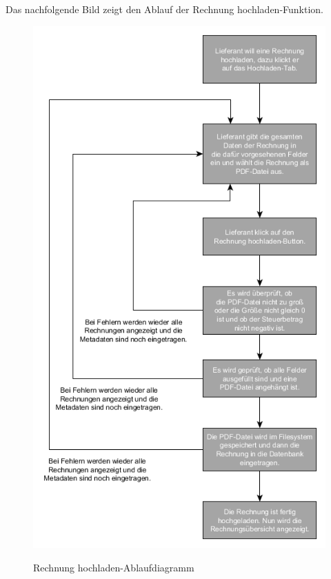 \newpage
Das nachfolgende Bild zeigt den Ablauf der \glqq Rechnung hochladen\grqq{}-Funktion.
\begin{figure}[!h]
    \centering
    \includegraphics[width=12cm]{figures/rechnunghochladen.png}
    \label{fig:takebill}
    \caption{Rechnung hochladen-Ablaufdiagramm}
\end{figure}

\newpage

